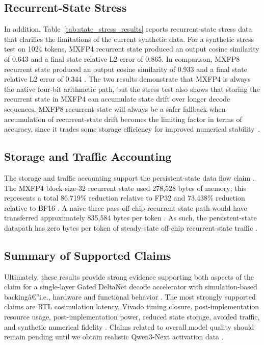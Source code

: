 ﻿\documentclass[conference]{IEEEtran}
\begin{document}
\subsection{Recurrent-State Stress}
In addition, Table~\ref{tab:state_stress_results} reports recurrent-state stress data that clarifies the limitations of the current synthetic data. For a synthetic stress test on 1024 tokens, MXFP4 recurrent state produced an output cosine similarity of 0.643 and a final state relative L2 error of 0.865. In comparison, MXFP8 recurrent state produced an output cosine similarity of 0.933 and a final state relative L2 error of 0.344 \cite{b10,b12}. The two results demonstrate that MXFP4 is always the native four-bit arithmetic path, but the stress test also shows that storing the recurrent state in MXFP4 can accumulate state drift over longer decode sequences. MXFP8 recurrent state will always be a safer fallback when accumulation of recurrent-state drift becomes the limiting factor in terms of accuracy, since it trades some storage efficiency for improved numerical stability~\cite{b3,b10,b12}.



\subsection{Storage and Traffic Accounting}
The storage and traffic accounting support the persistent-state data flow claim \cite{b5,b10}. The MXFP4 block-size-32 recurrent state used 278,528 bytes of memory; this represents a total 86.719\% reduction relative to FP32 and 73.438\% reduction relative to BF16 \cite{b10,b12}. A naive three-pass off-chip recurrent-state path would have transferred approximately 835,584 bytes per token \cite{b7,b10}. As such, the persistent-state datapath has zero bytes per token of steady-state off-chip recurrent-state traffic \cite{b7,b10}.



\subsection{Summary of Supported Claims}
Ultimately, these results provide strong evidence supporting both aspects of the claim for a single-layer Gated DeltaNet decode accelerator with simulation-based backingâ€”i.e., hardware and functional behavior \cite{b3,b10}. The most strongly supported claims are RTL cosimulation latency, Vivado timing closure, post-implementation resource usage, post-implementation power, reduced state storage, avoided traffic, and synthetic numerical fidelity \cite{b3,b5,b10,b12}. Claims related to overall model quality should remain pending until we obtain realistic Qwen3-Next activation data \cite{b3,b6,b8,b9,b11}.
\end{document}
